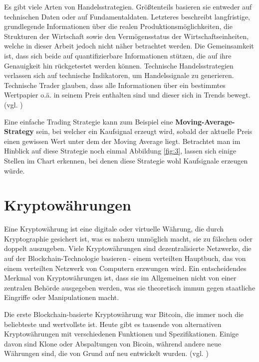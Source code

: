 \documentclass[oneside]{ausarbeitung}
\begin{document}
Es gibt viele Arten von Handelsstrategien. Größtenteils basieren sie
entweder auf technischen Daten oder auf
Fundamentaldaten. Letzteres beschreibt langfristige, grundlegende
Informationen über die realen Produktionsmöglichkeiten, die
Strukturen der Wirtschaft sowie den Vermögensstatus der
Wirtschaftseinheiten, welche in dieser Arbeit jedoch nicht näher
betrachtet werden\cite{fundamentaldaten}. Die Gemeinsamkeit ist, dass
sich beide auf quantifizierbare Informationen stützen, die auf ihre
Genauigkeit hin rückgetestet werden können.
Technische Handelsstrategien verlassen sich auf technische
Indikatoren, um Handelssignale zu generieren. Technische Trader
glauben, dass alle Informationen über ein bestimmtes Wertpapier o.ä.
in seinem Preis enthalten sind und dieser sich in Trends bewegt.
(vgl. \cite{trading_strategy}) 

Eine einfache Trading Strategie kann zum Beispiel eine
\textbf{Moving-Average-Strategy} sein, bei welcher ein Kaufsignal
erzeugt wird, sobald der aktuelle Preis einen gewissen Wert unter dem
der Moving Average liegt. Betrachtet man im Hinblick auf diese
Strategie noch einmal Abbildung \ref{fig:3}, lassen sich einige
Stellen im Chart erkennen, bei denen diese Strategie wohl Kaufsignale
erzeugen würde. 


\section{Kryptowährungen}
\label{sec:kryptowährungen}

Eine Kryptowährung ist eine digitale oder virtuelle Währung, die
durch Kryptographie gesichert ist, was es nahezu unmöglich macht, sie
zu fälschen oder doppelt auszugeben. Viele Kryptowährungen sind
dezentralisierte Netzwerke, die auf der Blockchain-Technologie
basieren - einem verteilten Hauptbuch, das von einem verteilten
Netzwerk von Computern erzwungen wird. Ein entscheidendes Merkmal von
Kryptowährungen ist, dass sie im Allgemeinen nicht von einer
zentralen Behörde ausgegeben werden, was sie theoretisch immun gegen
staatliche Eingriffe oder Manipulationen macht.

Die erste Blockchain-basierte Kryptowährung war Bitcoin, die
immer noch die beliebteste und wertvollste ist. Heute gibt es tausende
von alternativen Kryptowährungen mit verschiedenen Funktionen und
Spezifikationen. Einige davon sind Klone oder Abspaltungen von Bicoin,
während andere neue Währungen sind, die von Grund auf neu entwickelt
wurden. (vgl. \cite{cryptocurrency_explained})
\end{document}
